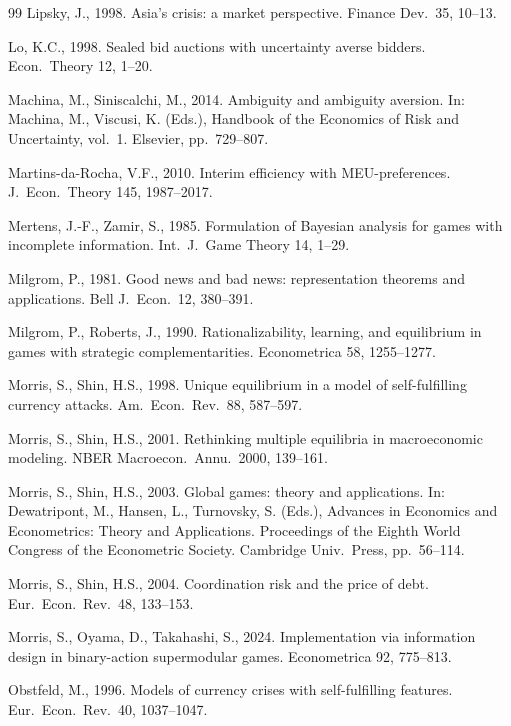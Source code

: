 \documentclass[12pt,a4paper]{article}
\theoremstyle{definition}
\theoremstyle{remark}
\begin{document}
\begin{thebibliography}{99}
Lipsky, J., 1998. Asia's crisis: a market perspective. Finance Dev.\ 35, 10--13.

Lo, K.C., 1998. Sealed bid auctions with uncertainty averse bidders. Econ.\ Theory 12, 1--20.

Machina, M., Siniscalchi, M., 2014. Ambiguity and ambiguity aversion. In: Machina, M., Viscusi, K. (Eds.), Handbook of the Economics of Risk and Uncertainty, vol.\ 1. Elsevier, pp.\ 729--807.

Martins-da-Rocha, V.F., 2010. Interim efficiency with MEU-preferences. J.\ Econ.\ Theory 145, 1987--2017.

Mertens, J.-F., Zamir, S., 1985. Formulation of Bayesian analysis for games with incomplete information. Int.\ J.\ Game Theory 14, 1--29.

Milgrom, P., 1981. Good news and bad news: representation theorems and applications. Bell J.\ Econ.\ 12, 380--391.

Milgrom, P., Roberts, J., 1990. Rationalizability, learning, and equilibrium in games with strategic complementarities. Econometrica 58, 1255--1277.

Morris, S., Shin, H.S., 1998. Unique equilibrium in a model of self-fulfilling currency attacks. Am.\ Econ.\ Rev.\ 88, 587--597.

Morris, S., Shin, H.S., 2001. Rethinking multiple equilibria in macroeconomic modeling. NBER Macroecon.\ Annu.\ 2000, 139--161.

Morris, S., Shin, H.S., 2003. Global games: theory and applications. In: Dewatripont, M., Hansen, L., Turnovsky, S. (Eds.), Advances in Economics and Econometrics: Theory and Applications. Proceedings of the Eighth World Congress of the Econometric Society. Cambridge Univ.\ Press, pp.\ 56--114.

Morris, S., Shin, H.S., 2004. Coordination risk and the price of debt. Eur.\ Econ.\ Rev.\ 48, 133--153.

Morris, S., Oyama, D., Takahashi, S., 2024. Implementation via information design in binary-action supermodular games. Econometrica 92, 775--813.

Obstfeld, M., 1996. Models of currency crises with self-fulfilling features. Eur.\ Econ.\ Rev.\ 40, 1037--1047.


\end{thebibliography}
\end{document}
